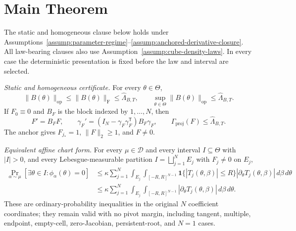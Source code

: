 \section{Main Theorem}\label{sec:main-theorem}

\begin{theorem}\label{thm:main}
The static and homogeneous clause below holds under
Assumptions~\ref{assump:parameter-regime}--\ref{assump:anchored-derivative-closure}.
All law-bearing clauses also use Assumption~\ref{assump:cube-density-laws}.
In every case the deterministic presentation is fixed before the law and interval are selected.

\emph{Static and homogeneous certificate.} For every $\theta\in\Theta$,
\begin{equation}
\label{eq:main-display-001}
\|B(\theta)\|_{\mathrm{op}}\leq\|B(\theta)\|_{\mathrm F}\leq\widehat\Lambda_{B,T},
\qquad
\sup_{\theta\in\Theta}\|B(\theta)\|_{\mathrm{op}}\leq\widehat\Lambda_{B,T}.
\end{equation}
If $F_0\equiv0$ and $B_F$ is the block indexed by $1,\ldots,N$, then
\begin{equation}
\label{eq:main-display-002}
F'=B_FF,\qquad
\gamma_F'=(I_N-\gamma_F\gamma_F^{\mathsf T})B_F\gamma_F,\qquad
\Gamma_{\mathrm{proj}}(F)\leq\widehat\Lambda_{B,T}.
\end{equation}
The anchor gives $F_{j_*}=1$, $\|F\|_2\geq1$, and $F\neq0$.

\emph{Equivalent affine chart form.} For every $\mu\in\mathcal D$ and every interval
$I\subseteq\Theta$ with $|I|>0$, and every Lebesgue-measurable partition
$I=\bigsqcup_{j=1}^NE_j$ with $F_j\neq0$ on $E_j$,
\begin{equation}
\label{eq:main-display-003}
\begin{aligned}
\Pr_{\alpha\sim\mu}[\exists\theta\in I:\phi_\alpha(\theta)=0]
&\leq\kappa\sum_{j=1}^N\int_{E_j}\int_{[-R,R]^{N-1}}
\mathbf 1\{|T_j(\theta,\beta)|\leq R\}|\partial_\theta T_j(\theta,\beta)|\,d\beta\,d\theta\\
&\leq\kappa\sum_{j=1}^N\int_{E_j}\int_{[-R,R]^{N-1}}
|\partial_\theta T_j(\theta,\beta)|\,d\beta\,d\theta.
\end{aligned}
\end{equation}
These are ordinary-probability inequalities in the original $N$ coefficient coordinates; they remain valid
with no pivot margin, including tangent, multiple, endpoint, empty-cell, zero-Jacobian, persistent-root, and
$N=1$ cases.


\end{theorem}
